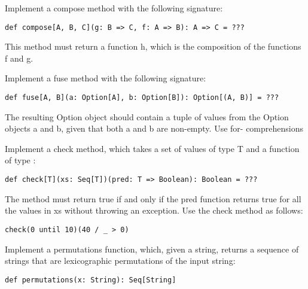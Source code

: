 \documentclass[11pt]{article}
\begin{document}
\begin{myExercise}
Implement a compose method with the following signature:
\begin{lstlisting}
def compose[A, B, C](g: B => C, f: A => B): A => C = ???
\end{lstlisting}
This method must return a function h, which is the composition of the
functions f and g.
\end{myExercise}

\begin{myExercise}
Implement a fuse method with the following signature:
\begin{lstlisting}
def fuse[A, B](a: Option[A], b: Option[B]): Option[(A, B)] = ???
\end{lstlisting}
The resulting Option object should contain a tuple of values from the Option objects a and b, given that both a and b are non-empty. Use for- comprehensions
\end{myExercise}

\begin{myExercise}
Implement a check method, which takes a set of values of type T and a function of type :
\begin{lstlisting}
def check[T](xs: Seq[T])(pred: T => Boolean): Boolean = ???
\end{lstlisting}
The method must return true if and only if the pred function returns true for all the values in xs without throwing an exception. Use the check method as follows:
\begin{lstlisting}
check(0 until 10)(40 / _ > 0)
\end{lstlisting}
\end{myExercise}


\begin{myExercise}
Implement a permutations function, which, given a string, returns a sequence of strings that are lexicographic permutations of the input string:
\begin{lstlisting}
def permutations(x: String): Seq[String]
\end{lstlisting}
\end{myExercise}
\end{document}

